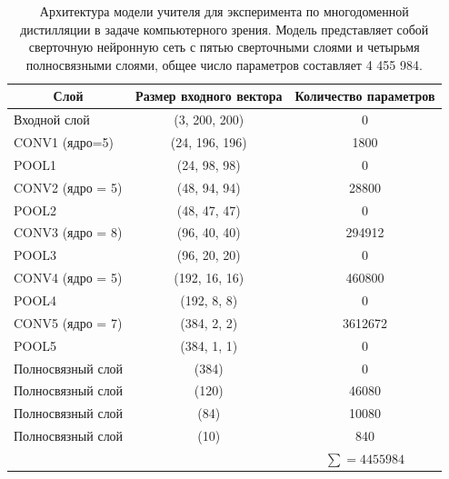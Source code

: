 \begin{table}[h!t]
\begin{center}
\caption{Архитектура модели учителя для эксперимента по многодоменной дистилляции в задаче компьютерного зрения. Модель представляет собой сверточную нейронную сеть с пятью сверточными слоями и четырьмя полносвязными слоями, общее число параметров составляет 4 455 984.}
\label{table_1}
\begin{tabular}{|c|c|c|}
\hline
	Слой & Размер входного вектора & Количество параметров\\
	\hline
	\multicolumn{1}{|l|}{Входной слой}
	& (3, 200, 200) & 0 \\
	\hline
	\multicolumn{1}{|l|}{CONV1 (ядро=5)}
	& (24, 196, 196) & 1800 \\
	\hline
	\multicolumn{1}{|l|}{POOL1}
	& (24, 98, 98) & 0 \\
	\hline
	\multicolumn{1}{|l|}{CONV2 (ядро = 5)}
	& (48, 94, 94) & 28800 \\
	\hline
	\multicolumn{1}{|l|}{POOL2}
	& (48, 47, 47) & 0 \\
	\hline
	\multicolumn{1}{|l|}{CONV3 (ядро = 8)}
	& (96, 40, 40) & 294912 \\
	\hline
	\multicolumn{1}{|l|}{POOL3}
	& (96, 20, 20) & 0 \\
	\hline
    \multicolumn{1}{|l|}{CONV4 (ядро = 5)}
	& (192, 16, 16) & 460800 \\
	\hline
	\multicolumn{1}{|l|}{POOL4}
	& (192, 8, 8) & 0 \\
    \hline
	\multicolumn{1}{|l|}{CONV5 (ядро = 7)}
	& (384, 2, 2) & 3612672 \\
	\hline
	\multicolumn{1}{|l|}{POOL5}
	& (384, 1, 1) & 0 \\
	\hline
	\multicolumn{1}{|l|}{Полносвязный слой}
	& (384) & 0 \\
	\hline
	\multicolumn{1}{|l|}{Полносвязный слой}
	& (120) & 46080 \\
	\hline
	\multicolumn{1}{|l|}{Полносвязный слой}
	& (84) & 10080 \\
	\hline
	\multicolumn{1}{|l|}{Полносвязный слой}
	& (10) & 840 \\
	\hline
	\multicolumn{1}{|l|}{}
	& & $\sum=4455984$ \\
\hline
\end{tabular}
\end{center}
\end{table}

